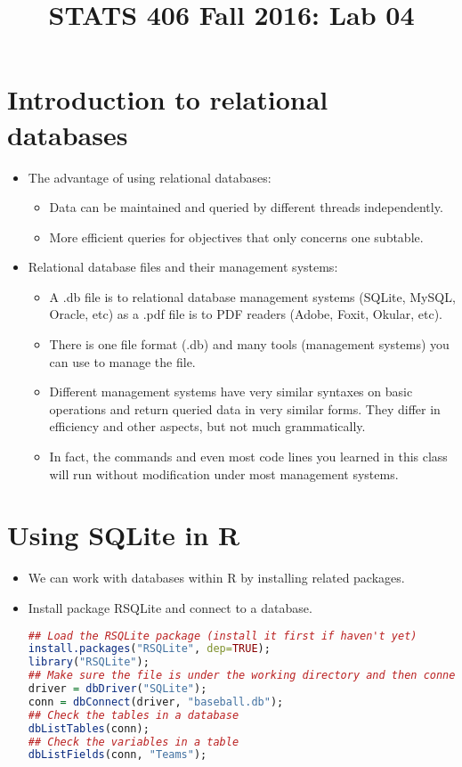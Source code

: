 \documentclass[12pt]{article}
\begin{document}
\title{\Large \bf STATS 406 Fall 2016: Lab 04}
\date{}

\maketitle

\section{Introduction to relational databases}
\begin{itemize}
	\item The advantage of using relational databases:
	\begin{itemize}[label=*]
		\item Data can be maintained and queried by different threads independently.
		\item More efficient queries for objectives that only concerns one subtable.
	\end{itemize}
	\item Relational database files and their management systems:
	\begin{itemize}[label=*]
		\item A .db file is to relational database management systems (SQLite, MySQL, Oracle, etc) as a .pdf file is to PDF readers (Adobe, Foxit, Okular, etc).
		\item There is one file format (.db) and many tools (management systems) you can use to manage the file.
		\item Different management systems have very similar syntaxes on basic operations and return queried data in very similar forms. They differ in efficiency and other aspects, but not much grammatically.
		\item In fact, the commands and even most code lines you learned in this class will run without modification under most management systems.
	\end{itemize}
\end{itemize}

\section{Using SQLite in R}
\begin{itemize}
	\item We can work with databases within R by installing related packages.
	\item Install package RSQLite and connect to a database.
\begin{lstlisting}[style=displaycode, language=R]
## Load the RSQLite package (install it first if haven't yet)
install.packages("RSQLite", dep=TRUE);
library("RSQLite");
## Make sure the file is under the working directory and then connect to it
driver = dbDriver("SQLite");
conn = dbConnect(driver, "baseball.db");
## Check the tables in a database
dbListTables(conn);
## Check the variables in a table
dbListFields(conn, "Teams");
\end{lstlisting}
	
\end{itemize}
\end{document}
